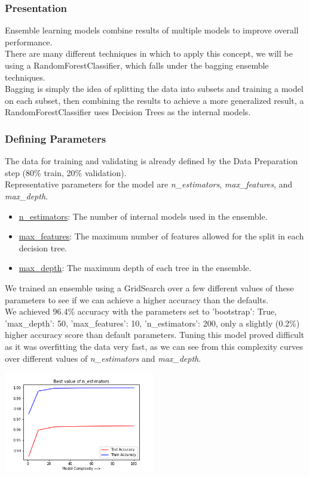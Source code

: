 \subsubsection{Presentation}
Ensemble learning models combine results of multiple models to improve overall performance.\\
There are many different techniques in which to apply this concept, we will be using a RandomForestClassifier, which falls under the bagging ensemble techniques.\\
Bagging is simply the idea of splitting the data into subsets and training a model on each subset, then combining the results to achieve a more generalized result, a RandomForestClassifier uses Decision Trees as the internal models.

\subsubsection{Defining Parameters}
The data for training and validating is already defined by the Data Preparation step (80\% train, 20\% validation).\\
Representative parameters for the model are \emph{n\_estimators}, \emph{max\_features}, and \emph{max\_depth}.
\begin{itemize}
    \item \underline{n\_estimators}: The number of internal models used in the ensemble.
    \item \underline{max\_features}: The maximum number of features allowed for the split in each decision tree.
    \item \underline{max\_depth}: The maximum depth of each tree in the ensemble.
\end{itemize}
We trained an ensemble using a GridSearch over a few different values of these parameters to see if we can achieve a higher accuracy than the defaults.\\
We achieved 96.4\% accuracy with the parameters set to {'bootstrap': True, 'max\_depth': 50, 'max\_features': 10, 'n\_estimators': 200}, only a slightly (0.2\%) higher accuracy score than default parameters.
Tuning this model proved difficult as it was overfitting the data very fast, as we can see from this complexity curves over different values of \emph{n\_estimators} and \emph{max\_depth}. \\
\begin{center}
    \captionsetup{type=figure}
    \includegraphics[width=250px]{RF_complexity_estimators.png}
\end{center}

